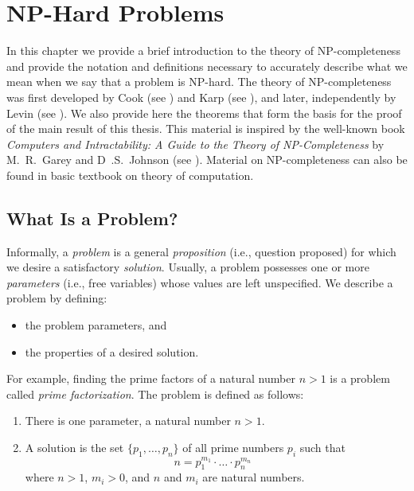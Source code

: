 
\chapter{NP-Hard Problems}\label{NP-HARD-CHAP}

In this chapter we provide a brief introduction to the theory of
NP-completeness and provide the notation and definitions necessary to
accurately describe what we mean when we say that a problem is NP-hard.
The theory of NP-completeness was first developed by Cook (see
\cite{Cook1971}) and Karp (see \cite{Karp1972}), and later, independently
by Levin (see \cite{Levin1973}).  We also provide here the theorems that
form the basis for the proof of the main result of this thesis.  This material
is inspired by the well-known book {\it Computers and Intractability: A Guide
to the Theory of\/ {\rm NP}-Completeness\/} by M.~R.~Garey and D~.S.~Johnson
(see \cite{Garey1979}).  Material on NP-completeness can also be found in
basic textbook on theory of computation.

\section{What Is a Problem?}

Informally, a {\em problem\/} is a general {\em proposition\/} (i.e., question
proposed) for which we desire a satisfactory {\em solution}.
Usually, a problem possesses one or more {\em parameters\/} (i.e., free
variables) whose values are left unspecified.  We describe a problem by
defining:
\begin{itemize}
\item the problem parameters, and
\item the properties of a desired solution.
\end{itemize}
For example, finding the prime factors of a natural number $n>1$ is a
problem called {\em prime factorization}.  The problem is defined as follows:
\begin{enumerate}
\item There is one parameter, a natural number $n>1$.
\item A solution is the set $\{p_1,\ldots,p_n\}$ of all prime numbers $p_i$
      such that
      $$
        n=p_1^{m_1}\cdot\ldots\cdot p_n^{m_n}\mbox{\ \ \ \ \ \ \ \ \ \ }
      $$
      where $n>1$, $m_i>0$, and $n$ and $m_i$ are natural numbers.
\end{enumerate}

